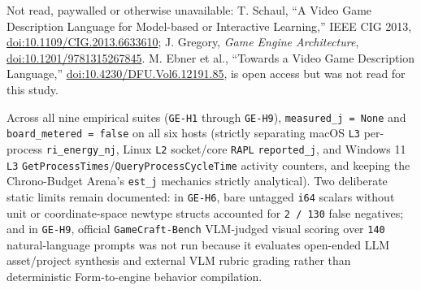 \documentclass[10pt,letterpaper]{article}
\begin{document}
Not read, paywalled or otherwise unavailable: T. Schaul, ``A Video Game
Description Language for Model-based or Interactive Learning,'' IEEE CIG
2013,
\href{https://doi.org/10.1109/CIG.2013.6633610}{doi:10.1109/CIG.2013.6633610};
J. Gregory, \emph{Game Engine Architecture},
\href{https://doi.org/10.1201/9781315267845}{doi:10.1201/9781315267845}.
M. Ebner et al., ``Towards a Video Game Description Language,''
\href{https://doi.org/10.4230/DFU.Vol6.12191.85}{doi:10.4230/DFU.Vol6.12191.85},
is open access but was not read for this study.

Across all nine empirical suites (\texttt{GE-H1} through
\texttt{GE-H9}), \texttt{measured\_\allowbreak{}j\ =\ None} and
\texttt{board\_\allowbreak{}metered\ =\ false} on all six hosts (strictly separating
macOS \texttt{L3} per-process \texttt{ri\_\allowbreak{}energy\_\allowbreak{}nj}, Linux \texttt{L2}
socket/core \texttt{RAPL} \texttt{reported\_\allowbreak{}j}, and Windows 11
\texttt{L3} \texttt{GetProcessTimes}/\allowbreak{}\texttt{QueryProcessCycleTime}
activity counters, and keeping the Chrono-Budget Arena's \texttt{est\_j}
mechanics strictly analytical). Two deliberate static limits remain
documented: in \texttt{GE-H6}, bare untagged \texttt{i64} scalars
without unit or coordinate-space newtype structs accounted for
\texttt{2\ /\ 130} false negatives; and in \texttt{GE-H9}, official
\texttt{GameCraft-\allowbreak{}Bench} VLM-judged visual scoring over \texttt{140}
natural-language prompts was not run because it evaluates open-ended LLM
asset/project synthesis and external VLM rubric grading rather than
deterministic Form-to-engine behavior compilation.
\end{document}
